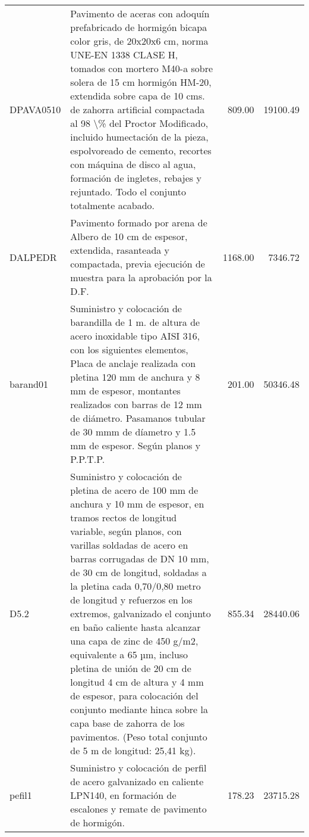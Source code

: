\documentclass{article}%
\begin{document}
\begin{longtable}{|l|p{4cm}|r|r|}
DPAVA0510&Pavimento de aceras con adoquín prefabricado de hormigón bicapa color gris, de 20x20x6 cm, norma UNE{-}EN 1338 CLASE H, tomados con mortero M40{-}a sobre solera de 15 cm hormigón HM{-}20, extendida sobre capa de 10 cms. de zahorra artificial compactada al 98 \textbackslash{}\% del Proctor Modificado, incluido humectación de la pieza, espolvoreado de cemento, recortes con máquina de disco al agua, formación de ingletes, rebajes y rejuntado. Todo el conjunto totalmente acabado.&809.00&19100.49\\%
DALPEDR&Pavimento formado por arena de Albero de 10 cm de espesor, extendida, rasanteada y compactada, previa ejecución de muestra para la aprobación por la D.F.&1168.00&7346.72\\%
barand01&Suministro y colocación de barandilla de 1 m. de altura de acero inoxidable tipo AISI 316, con los siguientes elementos, Placa de anclaje realizada con pletina 120 mm de anchura  y 8 mm de espesor, montantes realizados con barras de 12 mm de diámetro. Pasamanos tubular de 30 mmm de díametro y 1.5 mm de espesor. Según planos y P.P.T.P.&201.00&50346.48\\%
D5.2&Suministro y colocación de pletina de acero de 100 mm de anchura y 10 mm de espesor, en tramos rectos de longitud variable, según planos, con varillas soldadas de acero en barras corrugadas de DN 10 mm, de 30 cm de longitud, soldadas a la pletina cada 0,70/0,80 metro de longitud y refuerzos en los extremos, galvanizado el conjunto en baño caliente hasta alcanzar una capa de zinc de 450 g/m2, equivalente a 65 µm, incluso pletina de unión de 20 cm de longitud 4 cm de altura y 4 mm de espesor, para colocación del conjunto mediante hinca sobre la capa base de zahorra de los pavimentos. (Peso total conjunto de 5 m de longitud: 25,41 kg).&855.34&28440.06\\%
pefil1&Suministro y colocación de perfil de acero galvanizado en caliente LPN140, en formación de escalones y remate de pavimento de hormigón.&178.23&23715.28\\%
\end{longtable}%
\end{document}
